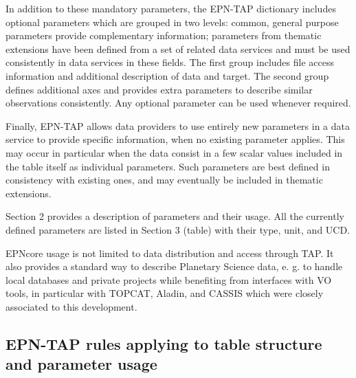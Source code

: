\documentclass[11pt,a4paper]{ivoa}
\begin{document}
In addition to these mandatory parameters, the EPN-TAP dictionary includes optional parameters which are grouped in two levels: common, general purpose parameters provide complementary information; parameters from thematic extensions have been defined from a set of related data services and must be used consistently in data services in these fields. The first group includes file access information and additional description of data and target. The second group defines additional axes and provides extra parameters to describe similar observations consistently. Any optional parameter can be used whenever required. 

Finally, EPN-TAP allows data providers to use entirely new parameters in a data service to provide specific information, when no existing parameter applies. This may occur in particular when the data consist in a few scalar values included in the table itself as individual parameters. Such parameters are best defined in consistency with existing ones, and may eventually be included in thematic extensions. 

Section 2 provides a description of parameters and their usage. All the currently defined parameters are listed in Section 3 (table) with their type, unit, and UCD. 

EPNcore usage is not limited to data distribution and access through TAP. It also provides a standard way to describe Planetary Science data, e. g. to handle local databases and private projects while benefiting from interfaces with VO tools, in particular with TOPCAT, Aladin, and CASSIS which were closely associated to this development. 

\subsection{EPN-TAP rules applying to table structure and parameter usage}
\end{document}
